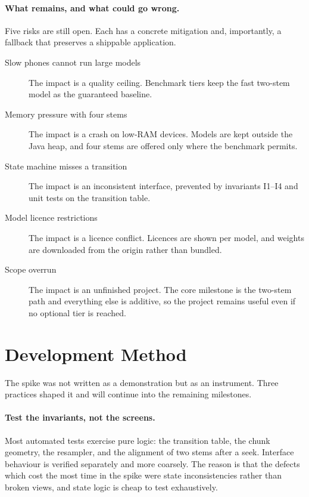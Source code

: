 \documentclass[letterpaper]{article} %
\begin{document}
\paragraph{What remains, and what could go wrong.} Five risks are still open.
Each has a concrete mitigation and, importantly, a fallback that preserves a
shippable application.

\begin{description}
\item[Slow phones cannot run large models] The impact is a quality ceiling.
  Benchmark tiers keep the fast two-stem model as the guaranteed baseline.

\item[Memory pressure with four stems] The impact is a crash on low-RAM
  devices. Models are kept outside the Java heap, and four stems are offered
  only where the benchmark permits.

\item[State machine misses a transition] The impact is an inconsistent
  interface, prevented by invariants I1--I4 and unit tests on the transition
  table.

\item[Model licence restrictions] The impact is a licence conflict. Licences
  are shown per model, and weights are downloaded from the origin rather than
  bundled.

\item[Scope overrun] The impact is an unfinished project. The core milestone
  is the two-stem path and everything else is additive, so the project remains
  useful even if no optional tier is reached.
\end{description}

\section{Development Method}

The spike was not written as a demonstration but as an instrument. Three
practices shaped it and will continue into the remaining milestones.

\paragraph{Test the invariants, not the screens.} Most automated tests exercise
pure logic: the transition table, the chunk geometry, the resampler, and the
alignment of two stems after a seek. Interface behaviour is verified separately
and more coarsely. The reason is that the defects which cost the most time in
the spike were state inconsistencies rather than broken views, and state logic
is cheap to test exhaustively.
\end{document}
